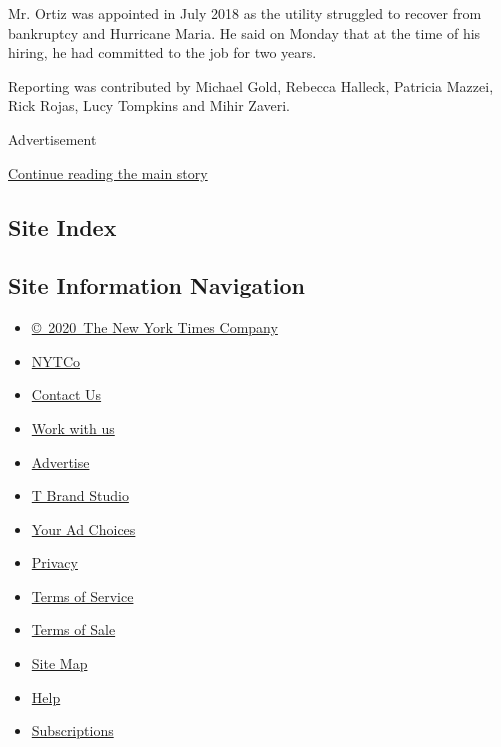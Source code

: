 Mr. Ortiz was appointed in July 2018 as the utility struggled to recover
from bankruptcy and Hurricane Maria. He said on Monday that at the time
of his hiring, he had committed to the job for two years.

Reporting was contributed by Michael Gold, Rebecca Halleck, Patricia
Mazzei, Rick Rojas, Lucy Tompkins and Mihir Zaveri.

Advertisement

\protect\hyperlink{after-bottom}{Continue reading the main story}

\hypertarget{site-index}{%
\subsection{Site Index}\label{site-index}}

\hypertarget{site-information-navigation}{%
\subsection{Site Information
Navigation}\label{site-information-navigation}}

\begin{itemize}
\tightlist
\item
  \href{https://help.nytimes3xbfgragh.onion/hc/en-us/articles/115014792127-Copyright-notice}{©~2020~The
  New York Times Company}
\end{itemize}

\begin{itemize}
\tightlist
\item
  \href{https://www.nytco.com/}{NYTCo}
\item
  \href{https://help.nytimes3xbfgragh.onion/hc/en-us/articles/115015385887-Contact-Us}{Contact
  Us}
\item
  \href{https://www.nytco.com/careers/}{Work with us}
\item
  \href{https://nytmediakit.com/}{Advertise}
\item
  \href{http://www.tbrandstudio.com/}{T Brand Studio}
\item
  \href{https://www.nytimes3xbfgragh.onion/privacy/cookie-policy\#how-do-i-manage-trackers}{Your
  Ad Choices}
\item
  \href{https://www.nytimes3xbfgragh.onion/privacy}{Privacy}
\item
  \href{https://help.nytimes3xbfgragh.onion/hc/en-us/articles/115014893428-Terms-of-service}{Terms
  of Service}
\item
  \href{https://help.nytimes3xbfgragh.onion/hc/en-us/articles/115014893968-Terms-of-sale}{Terms
  of Sale}
\item
  \href{https://spiderbites.nytimes3xbfgragh.onion}{Site Map}
\item
  \href{https://help.nytimes3xbfgragh.onion/hc/en-us}{Help}
\item
  \href{https://www.nytimes3xbfgragh.onion/subscription?campaignId=37WXW}{Subscriptions}
\end{itemize}
